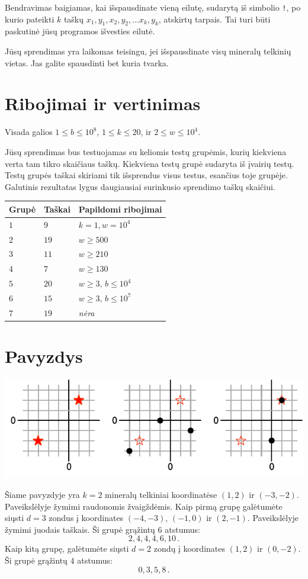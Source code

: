 Bendravimas baigiamas, kai išspausdinate vieną eilutę, sudarytą iš simbolio \texttt{!}, po kurio pateikti
$k$ taškų \newline $x_1, y_1, x_2, y_2, \ldots x_k, y_k$, atskirtų tarpais.
Tai turi būti paskutinė jūsų programos išvesties eilutė.

Jūsų sprendimas yra laikomas teisingu, jei išspausdinate visų mineralų telkinių vietas. 
Jas galite spausdinti bet kuria tvarka.

\section*{Ribojimai ir vertinimas}

Visada galios
$1\leq b \leq 10^8$, %
$1 \leq k \leq 20$, %
ir
$2 \le w \le 10^4$. %

Jūsų sprendimas bus testuojamas su keliomis testų grupėmis, kurių kiekviena verta tam tikro skaičiaus taškų.
Kiekviena testų grupė sudaryta iš įvairių testų.
Testų grupės taškai skiriami tik išsprendus visus testus, esančius toje grupėje.
Galutinis rezultatas lygus daugiausiai surinkusio sprendimo taškų skaičiui.

\medskip
\begin{tabular}{lll}
Grupė & Taškai & Papildomi ribojimai \\\hline
  $1$ & $9$ & $k = 1, w = 10^4$\\
  $2$ & $19$ & $w \ge 500$\\
  $3$ & $11$ & $w \ge 210$\\
  $4$ & $7$ & $w \ge 130$\\
  $5$ & $20$ & $w \ge 3$, $b \le 10^4$\\
  $6$ & $15$ & $w \ge 3$, $b \le 10^7$\\
  $7$ & $19$ & \emph{nėra}
\end{tabular}

\section*{Pavyzdys}

\includegraphics[width=.6\textwidth]{img/sample1.pdf}

Šiame pavyzdyje yra $k=2$ mineralų telkiniai koordinatėse $(1,2)$ ir $(-3,-2)$. Paveikslėlyje žymimi raudonomis žvaigždėmis.
Kaip pirmą grupę galėtumėte siųsti $d=3$ zondus į koordinates $(-4,-3)$, $(-1, 0)$ ir $(2,-1)$. Paveikslėlyje žymimi juodais taškais.
Ši grupė grąžintų $6$ atstumus: \[
  2, 4, 4, 4, 6, 10\,.
\]
Kaip kitą grupę, galėtumėte siųsti $d=2$ zondų į koordinates $(1,2)$ ir $(0,-2)$.
Ši grupė grąžintų $4$ atstumus: \[
  0, 3, 5, 8\,.
\]
